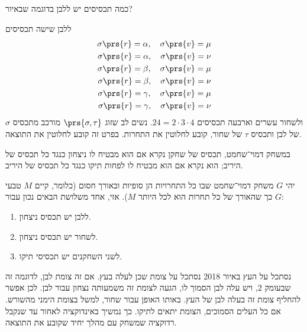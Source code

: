 \documentclass[a4paper,10pt,twoside,openany]{book}
\begin{document}
\begin{example}
כמה תכסיסים יש ללבן בדוגמה שבאיור?
\end{example}
\begin{solution}
ללבן שישה תכסיסים
\begin{align*}
\sigma\prs{r} = \alpha, \quad \sigma\prs{v} = \mu \\
\sigma\prs{r} = \alpha, \quad \sigma\prs{v} = \nu \\
\sigma\prs{r} = \beta, \quad \sigma\prs{v} = \mu \\
\sigma\prs{r} = \beta, \quad \sigma\prs{v} = \nu \\
\sigma\prs{r} = \gamma, \quad \sigma\prs{v} = \mu \\
\sigma\prs{r} = \gamma, \quad \sigma\prs{v} = \nu
\end{align*}
ולשחור עשרים וארבעה תכסיסים
$24 = 2 \cdot 3 \cdot 4$.
נשים לב שזוג
$\prs{\sigma, \tau}$
מורכב מתכסיס
$\sigma$
של לבן ותכסיס
$\tau$
של שחור, קובע לחלוטין את התחרות. בפרט זה קובע לחלוטין את התוצאה.
\end{solution}

\begin{definition}
במשחק דמוי־שחמט, תכסיס של שחקן נקרא 
אם הוא מבטיח לו ניצחון כנגד כל תכסיס של היריב; הוא נקרא 
אם הוא מבטיח לו לפחות תיקו כנגד כל תכסיס של היריב.
\end{definition}

\begin{theorem}
יהי $G$ משחק דמוי־שחמט שבו כל התחרויות הן סופיות ובאורך חסום (כלומר, קיים $M$ טבעי כך שהאורך של כל תחרות הוא לכל היותר $M$).
אזי, אחד משלושת הבאים נכון עבור $G$:
\begin{enumerate}
\item ללבן יש תכסיס ניצחון.
\item לשחור יש תכסיס ניצחון.
\item לשני השחקנים יש תכסיסי תיקו.
\end{enumerate} 
\end{theorem}
\begin{example}
נסתכל על העץ באיור%
%
{2018}
נסתכל על צומת שכן לעלה בעץ. אם זה צומת לבן, לדוגמה זה שבעומק
$2$,
ויש עלה לבן הסמוך לו, הגעה לצומת זה משמעותה נצחון עבור לבן. לכן אפשר להחליף צומת זה בעלה לבן של העץ.
באותו האופן עבור שחור, למשל בצומת הימני מהשורש. אם כל העלים הסמוכים, הצומת יתאים לתיקו. כך נמשיך באינדוקציה לאחור עד שנקבל רדוקציה שמשחק עם מהלך יחיד שקובע את התוצאה.
\end{example}
\end{document}
